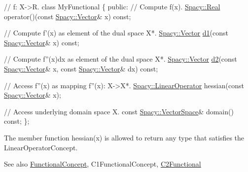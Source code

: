 \begin{DoxyCode}
\textcolor{comment}{// f: X->R.}
\textcolor{keyword}{class }MyFunctional
\{
\textcolor{keyword}{public}:
  \textcolor{comment}{// Compute f(x).}
  \hyperlink{classSpacy_1_1Real}{Spacy::Real} operator()(\textcolor{keyword}{const} \hyperlink{classSpacy_1_1Vector}{Spacy::Vector}& x) \textcolor{keyword}{const};

  \textcolor{comment}{// Compute f'(x) as element of the dual space X*.}
  \hyperlink{classSpacy_1_1Vector}{Spacy::Vector} \hyperlink{namespaceSpacy_ab6646eb7068eb9f1369e639cf0b620a2}{d1}(\textcolor{keyword}{const} \hyperlink{classSpacy_1_1Vector}{Spacy::Vector}& x) \textcolor{keyword}{const};

  \textcolor{comment}{// Compute f''(x)dx as element of the dual space X*.}
  \hyperlink{classSpacy_1_1Vector}{Spacy::Vector} \hyperlink{namespaceSpacy_a569d8fc0b4a0e292f257dd6307a25c8f}{d2}(\textcolor{keyword}{const} \hyperlink{classSpacy_1_1Vector}{Spacy::Vector}& x, \textcolor{keyword}{const} 
      \hyperlink{classSpacy_1_1Vector}{Spacy::Vector}& dx) \textcolor{keyword}{const};

  \textcolor{comment}{// Access f''(x) as mapping f''(x): X->X*.}
  \hyperlink{classSpacy_1_1LinearOperator}{Spacy::LinearOperator} hessian(\textcolor{keyword}{const} \hyperlink{classSpacy_1_1Vector}{Spacy::Vector}& x);

  \textcolor{comment}{// Access underlying domain space X.}
  \textcolor{keyword}{const} \hyperlink{classSpacy_1_1VectorSpace}{Spacy::VectorSpace}& domain() \textcolor{keyword}{const};
\};
\end{DoxyCode}


The member function {\ttfamily hessian(x)} is allowed to return any type that satisfies the Linear\+Operator\+Concept.

\begin{DoxySeeAlso}{See also}
\hyperlink{group__ConceptGroup_gae45328d2e01ef6c8e5d948b69fda385f}{Functional\+Concept}, C1\+Functional\+Concept, \hyperlink{classSpacy_1_1C2Functional}{C2\+Functional} 
\end{DoxySeeAlso}
\hypertarget{group__ConceptGroup_ga5a296e4942cbfeba1e8538594a6e9c26}{}
